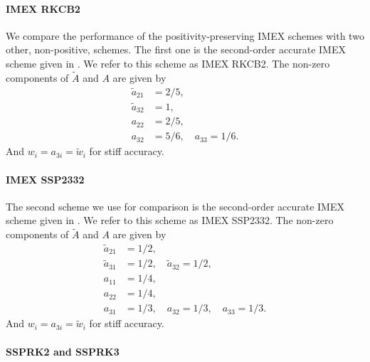 \paragraph{IMEX RKCB2}

We compare the performance of the positivity-preserving IMEX schemes with two other, non-positive, schemes.  
The first one is the second-order accurate IMEX scheme given in \cite{cavaglieriBewley2015}.  
We refer to this scheme as IMEX RKCB2.  
The non-zero components of $\tilde{A}$ and $A$ are given by
\begin{align}
  \tilde{a}_{21} &= 2/5, \nonumber \\
  \tilde{a}_{32} &= 1, \nonumber \\
  a_{22} &= 2/5, \nonumber \\
  a_{32} &= 5/6, \quad a_{33} = 1/6. \nonumber
\end{align}
And $w_{i} = a_{3i} = \tilde{w}_{i}$ for stiff accuracy.

\paragraph{IMEX SSP2332}

The second scheme we use for comparison is the second-order accurate IMEX scheme given in \cite{pareschiRusso_2005}.  
We refer to this scheme as IMEX SSP2332.  
The non-zero components of $\tilde{A}$ and $A$ are given by
\begin{align}
  \tilde{a}_{21} &= 1/2, \nonumber \\
  \tilde{a}_{31} &= 1/2, \quad \tilde{a}_{32} = 1/2, \nonumber \\
  a_{11} &= 1/4, \nonumber \\
  a_{22} &= 1/4, \nonumber \\
  a_{31} &= 1/3, \quad a_{32} = 1/3, \quad a_{33} = 1/3. \nonumber
\end{align}
And $w_{i} = a_{3i} = \tilde{w}_{i}$ for stiff accuracy.

\paragraph{SSPRK2 and SSPRK3}

